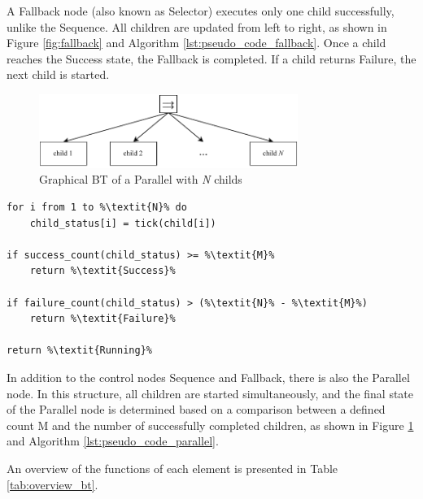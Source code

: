   A Fallback node (also known as Selector) executes only one child successfully, unlike the Sequence. All children are updated from left to right, as shown in Figure \ref{fig:fallback} and Algorithm \ref{lst:pseudo_code_fallback}. Once a child reaches the Success state, the Fallback is completed. If a child returns Failure, the next child is started.

\begin{figure}[h]
    \centering
    \includegraphics[width=0.75\textwidth]{figures/02_state_of_the_art/parallel.pdf}
    \caption{Graphical BT of a Parallel with \textit{N} childs}
    \label{fig:parallel}
\end{figure}
  
\begin{lstlisting}[float=h]
for i from 1 to %\textit{N}% do
    child_status[i] = tick(child[i])
    
if success_count(child_status) >= %\textit{M}%
    return %\textit{Success}%
        
if failure_count(child_status) > (%\textit{N}% - %\textit{M}%)
    return %\textit{Failure}%

return %\textit{Running}%
\end{lstlisting}

In addition to the control nodes Sequence and Fallback, there is also the Parallel node. In this structure, all children are started simultaneously, and the final state of the Parallel node is determined based on a comparison between a defined count M and the number of successfully completed children, as shown in Figure \ref{fig:parallel} and Algorithm \ref{lst:pseudo_code_parallel}.

An overview of the functions of each element is presented in Table \ref{tab:overview_bt}.

